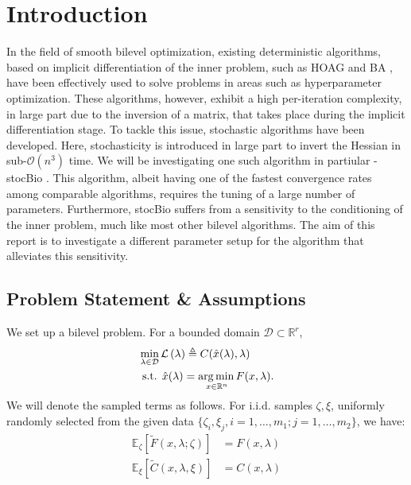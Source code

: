 \documentclass[11pt, twoside]{report}
\begin{document}
\section{Introduction}
In the field of smooth bilevel optimization, existing deterministic algorithms, based on implicit differentiation of the inner problem, such as HOAG \cite{pedregosa2016hyperparameter} and BA \cite{ghadimi2018approximation}, have been effectively used to solve problems in areas such as hyperparameter optimization. These algorithms, however, exhibit a high per-iteration complexity, in large part due to the inversion of a matrix, that takes place during the implicit differentiation stage. To tackle this issue, stochastic algorithms have been developed. Here, stochasticity is introduced in large part to invert the Hessian in sub-$\mathcal{O}(n^3)$ time. We will be investigating one such algorithm in partiular - stocBio \cite{ji2021bilevel}. This algorithm, albeit having one of the fastest convergence rates among comparable algorithms, requires the tuning of a large number of parameters. Furthermore, stocBio suffers from a sensitivity to the conditioning of the inner problem, much like most other bilevel algorithms. The aim of this report is to investigate a different parameter setup for the algorithm that alleviates this sensitivity.

\subsection{Problem Statement \& Assumptions}
We set up a bilevel problem. For a bounded domain $\mathcal D \subset \mathbb{R}^r$,
\begin{align} 
&\min_{\lambda \in \mathcal{D}} \mathcal{L}\left(\lambda \right) \triangleq C(\hat{x}(\lambda), \lambda) \label{outer_hoag_neu}\\
&\text { s.t. } \hat{x}(\lambda) =\underset{x \in \mathbb{R}^{n}} {\operatorname*{arg\, min \,}} {F(x, \lambda)}. \label{inner_hoag_neu}
\end{align}
We will denote the sampled terms as follows. For i.i.d. samples $\zeta, \xi$, uniformly randomly selected from the given data $\{\zeta_i, \xi_j, i = 1,\hdots, m_1; j = 1,\hdots, m_2 \}$, we have:
\begin{align*}
    \mathbb{E}_{\zeta}[\tilde{F}\left(x, \lambda ; \zeta\right)] &= F\left(x, \lambda\right) \\
    \mathbb{E}_{\xi}[\tilde{C}(x,\lambda,\xi)] &= C(x,\lambda) \\
\end{align*}
\end{document}
